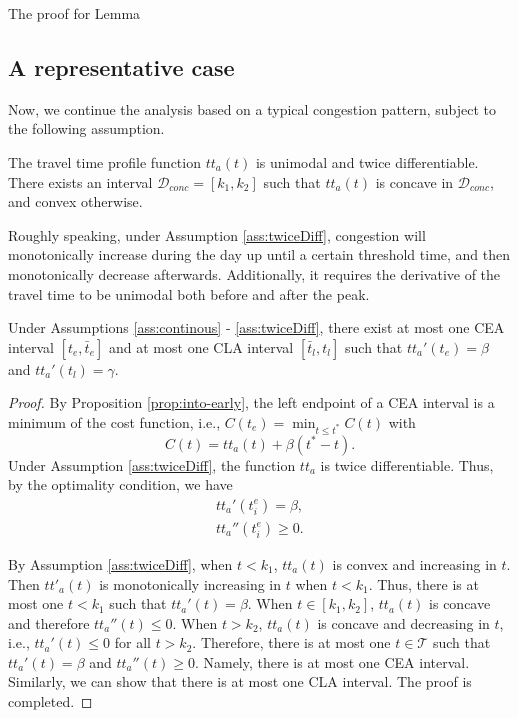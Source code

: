 The proof for Lemma

\subsection{A representative case}

Now, we continue the analysis based on a typical congestion pattern, subject to the following assumption.
\begin{assumption}\label{ass:twiceDiff}
   The travel time profile function $tt_a(t)$ is unimodal and twice differentiable. There exists an interval $   \mathcal{D}_{conc} = [k_1, k_2]$ such that $tt_a(t)$ is concave in $\mathcal{D}_{conc}$, and convex otherwise. 
\end{assumption}

Roughly speaking, under Assumption \ref{ass:twiceDiff}, congestion will monotonically increase during the day up until a certain threshold time, and then monotonically decrease afterwards. Additionally, it requires the derivative of the travel time to be unimodal both before and after the peak.



\begin{prop}
Under Assumptions \ref{ass:continous} - \ref{ass:twiceDiff}, there exist at most one CEA interval $[t_e, \bar t_e]$ and at most one CLA interval $[\bar t_l, t_l]$ such that $tt_a'(t_e)= \beta$ and $ tt_a'(t_l)= \gamma$.
\end{prop}
\begin{proof}
By Proposition \ref{prop:into-early}, the left endpoint of a CEA interval is a minimum of the cost function, i.e., $C(t_e) = \min_{t \le t^*} C(t)$ with 
   $$C(t) = tt_a(t) + \beta (t^* - t).$$
Under Assumption \ref{ass:twiceDiff}, the function $tt_a$ is twice differentiable. Thus, by the optimality condition, we have 
\begin{align}
tt_a'(t_i^e) = \beta,\\
tt_a''(t_i^e) \geq 0.
\end{align}

By Assumption \ref{ass:twiceDiff}, when $t < k_1$, $tt_a(t)$ is convex and increasing in $t$. Then $tt'_a(t)$ is monotonically increasing in $t$ when $t< k_1$. Thus, there is at most one $t < k_1$ such that $tt_a'(t) = \beta$. When $t \in [k_1, k_2]$,  $tt_a(t)$ is concave and therefore $tt_a''(t) \le 0$. When $t >k_2$,  $tt_a(t)$ is concave and decreasing in $t$, i.e., $tt_a'(t)\le 0$ for all $t > k_2$.  Therefore, there is at most one $t \in \mathcal{T}$ such that $tt_a'(t) = \beta$ and $tt_a''(t) \geq 0$. Namely, there is at most one CEA interval. Similarly, we can show that there is at most one CLA interval. The proof is completed. 
\end{proof}



